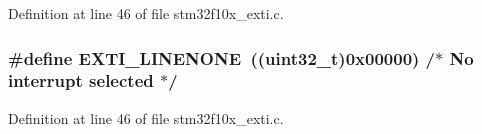 Definition at line 46 of file stm32f10x\+\_\+exti.\+c.

\subsubsection[{\texorpdfstring{E\+X\+T\+I\+\_\+\+L\+I\+N\+E\+N\+O\+NE}{EXTI_LINENONE}}]{\setlength{\rightskip}{0pt plus 5cm}\#define E\+X\+T\+I\+\_\+\+L\+I\+N\+E\+N\+O\+NE~(({\bf uint32\+\_\+t})0x00000)  /$\ast$ No interrupt selected $\ast$/}\hypertarget{group___e_x_t_i___private___defines_ga4451b67e337fc341394ee695273798af}{}\label{group___e_x_t_i___private___defines_ga4451b67e337fc341394ee695273798af}


Definition at line 46 of file stm32f10x\+\_\+exti.\+c.

